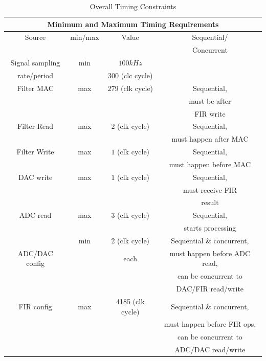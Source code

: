 \documentclass[journal]{IEEEtran} %
\begin{document}
\begin{table}[htbp]
\caption{Overall Timing Constraints}
\scriptsize
\begin{center}
\begin{tabular}{|c|c|c|c|}
\hline
\multicolumn{4}{|c|}{\textbf{Minimum and Maximum Timing Requirements}}\\
\hline
Source & min/max & Value & Sequential/\\
& & & Concurrent \\
\hline
Signal sampling & min & $100kHz$ & \\
rate/period & & $300$ (clc cycle) & \\
\hline
Filter MAC & max & $279$ (clk cycle) & Sequential, \\
& & & must be after\\
& & & FIR write \\
\hline
Filter Read & max & $2$ (clk cycle) & Sequential,\\
& & & must happen after MAC\\
\hline
Filter Write & max & $1$ (clk cycle) & Sequential,\\
& & & must happen before MAC\\
\hline
DAC write & max & $1$ (clk cycle) & Sequential, \\
& & & must receive FIR \\
& & & result \\
\hline
ADC read & max & 3 (clk cycle) & Sequential, \\
& & & starts processing \\
\hline
& min & 2 (clk cycle) & Sequential \& concurrent, \\
ADC/DAC config & & each & must happen before ADC read,\\
& & & can be concurrent to \\
& & & DAC/FIR read/write \\
\hline
FIR config & max & 4185 (clk cycle) & Sequential \& concurrent, \\
& & & must happen before FIR ops,\\
& & & can be concurrent to \\
& & & ADC/DAC read/write\\
\hline
\end{tabular}
\label{tbl:timing}
\end{center}
\end{table}
\end{document}
